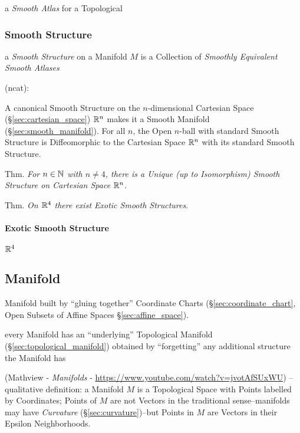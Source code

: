 a \emph{Smooth Atlas} for a Topological



\subsubsection{Smooth Structure}\label{sec:smooth_structure}

a \emph{Smooth Structure} on a Manifold $M$ is a Collection of \emph{Smoothly
  Equivalent Smooth Atlases}

(ncat):

A canonical Smooth Structure on the $n$-dimensional Cartesian Space
(\S\ref{sec:cartesian_space}) $\mathbb{R}^n$ makes it a Smooth Manifold
(\S\ref{sec:smooth_manifold}). For all $n$, the Open $n$-ball with standard
Smooth Structure is Diffeomorphic to the Cartesian Space $\mathbb{R}^n$ with its
standard Smooth Structure.

Thm. \emph{For $n \in \mathbb{N}$ with $n \neq 4$, there is a Unique (up to
  Isomorphism) Smooth Structure on Cartesian Space $\mathbb{R}^n$}.

Thm. \emph{On $\mathbb{R}^4$ there exist Exotic Smooth Structures}.



\paragraph{Exotic Smooth Structure}\label{sec:exotic_smooth_structure}\hfill

$\mathbb{R}^4$



\subsection{Manifold}\label{sec:manifold}


Manifold built by ``gluing together'' Coordinate Charts
(\S\ref{sec:coordinate_chart}, Open Subsets of Affine Spaces
\S\ref{sec:affine_space}).

every Manifold has an ``underlying'' Topological Manifold
(\S\ref{sec:topological_manifold}) obtained by ``forgetting'' any additional
structure the Manifold has

(Mathview - \emph{Manifolds} -
\url{https://www.youtube.com/watch?v=jvotAfSUxWU}) -- qualitative definition: a
Manifold $M$ is a Topological Space with Points labelled by Coordinates;
Points of $M$ are not Vectors in the traditional sense--manifolds may have
\emph{Curvature} (\S\ref{sec:curvature})--but Points in $M$ are Vectors in their
Epsilon Neighborhoods.

